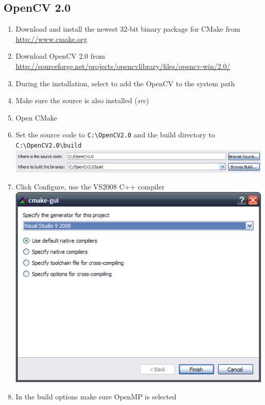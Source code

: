 \subsection*{OpenCV 2.0}
\begin{enumerate}
\item Download and install the newest 32-bit binary package for CMake  from \\ \url{http://www.cmake.org}
\item Download OpenCV 2.0 from \\ \url{http://sourceforge.net/projects/opencvlibrary/files/opencv-win/2.0/}
\item During the installation, select to add the OpenCV to the system path
\item Make sure the source is also installed (\textit{src}) 
\item Open CMake
\item Set the source code to \texttt{C:\textbackslash OpenCV2.0} and the build directory to \texttt{C:\textbackslash OpenCV2.0\textbackslash build} \\
\includegraphics[scale=0.75]{images/cmake.png} 
\item Click Configure, use the VS2008 C++ compiler\\
\includegraphics[scale=0.75]{images/cmake_compiler.png} 
\item In the build options make sure OpenMP is selected\\

\end{enumerate}
